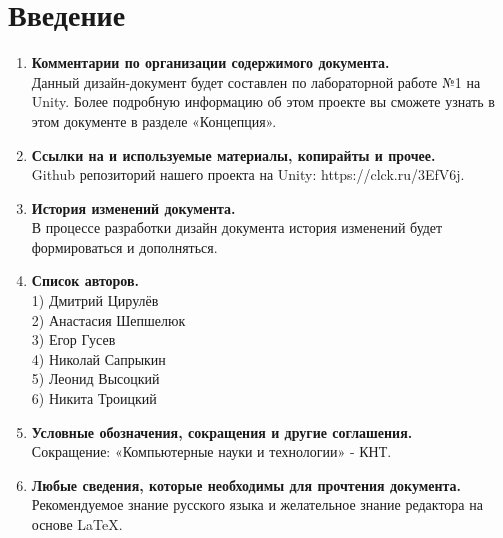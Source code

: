 \documentclass{article}
\begin{document}
\section{Введение}

\begin{enumerate}
    \item \textbf{Комментарии по организации содержимого документа.} \\
    Данный дизайн-документ будет составлен по лабораторной работе №1 на Unity. Более подробную информацию об этом проекте вы сможете узнать в этом документе в разделе «Концепция».

    \item \textbf{Ссылки на и используемые материалы, копирайты и прочее.} \\
    Github репозиторий нашего проекта на Unity: https://clck.ru/3EfV6j.

    \item \textbf{История изменений документа.} \\
    В процессе разработки дизайн документа история изменений будет формироваться и дополняться.

    \item \textbf{Список авторов.} \\
    1) Дмитрий Цирулёв\\2) Анастасия Шепшелюк\\3) Егор Гусев\\4) Николай Сапрыкин\\5) Леонид Высоцкий\\6) Никита Троицкий

    \item \textbf{Условные обозначения, сокращения и другие соглашения.} \\
    Сокращение: «Компьютерные науки и технологии» - КНТ.

    \item \textbf{Любые сведения, которые необходимы для прочтения документа.} \\
    Рекомендуемое знание русского языка и желательное знание редактора на основе LaTeX.
\end{enumerate}

\newpage
\end{document}
